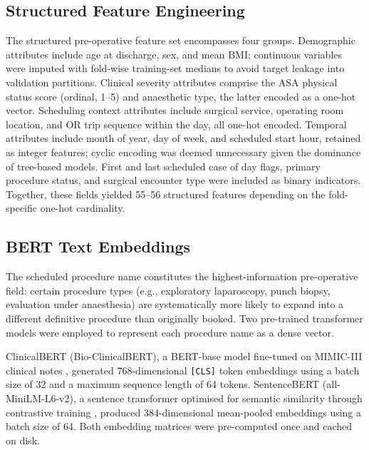 \subsection{Structured Feature Engineering}
\label{sec:struct}

The structured pre-operative feature set encompasses four groups.  Demographic
attributes include age at discharge, sex, and mean BMI; continuous variables
were imputed with fold-wise training-set medians to avoid target leakage into
validation partitions.  Clinical severity attributes comprise the ASA physical
status score (ordinal, 1--5) and anaesthetic type, the latter encoded as a
one-hot vector.  Scheduling context attributes include surgical service,
operating room location, and OR trip sequence within the day, all one-hot
encoded.  Temporal attributes include month of year, day of week, and scheduled
start hour, retained as integer features; cyclic encoding was deemed
unnecessary given the dominance of tree-based models.  First and last scheduled
case of day flags, primary procedure status, and surgical encounter type were
included as binary indicators.  Together, these fields yielded 55--56
structured features depending on the fold-specific one-hot cardinality.

\subsection{BERT Text Embeddings}
\label{sec:bert}

The scheduled procedure name constitutes the highest-information pre-operative
field: certain procedure types (e.g., exploratory laparoscopy, punch biopsy,
evaluation under anaesthesia) are systematically more likely to expand into a
different definitive procedure than originally booked.  Two pre-trained
transformer models were employed to represent each procedure name as a dense
vector.

ClinicalBERT (Bio-ClinicalBERT), a BERT-base model fine-tuned on MIMIC-III
clinical notes \citep{alsentzer2019publicly}, generated 768-dimensional
\texttt{[CLS]} token embeddings using a batch size of 32 and a maximum
sequence length of 64 tokens.  SentenceBERT (all-MiniLM-L6-v2), a sentence transformer optimised for semantic
similarity through contrastive training \citep{reimers2019sentence}, produced
384-dimensional mean-pooled embeddings using a batch size of 64.  Both embedding
matrices were pre-computed once and cached on disk.

